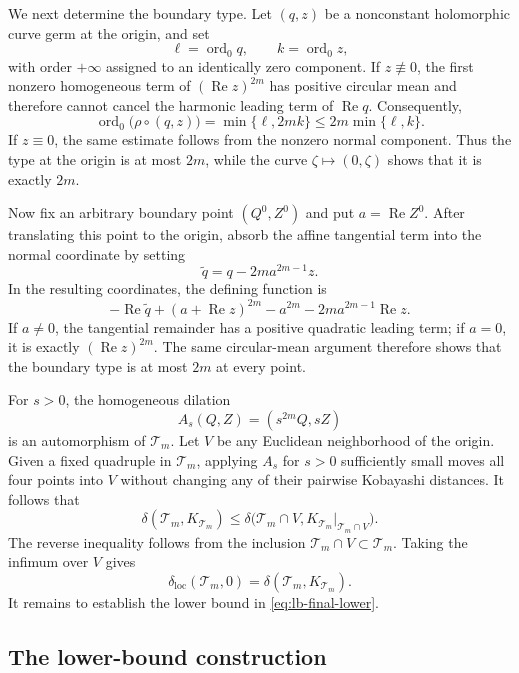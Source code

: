 \documentclass[11pt]{article}
\theoremstyle{definition}
\begin{document}
We next determine the boundary type. Let $(q,z)$ be a nonconstant
holomorphic curve germ at the origin, and set
\[
 \ell=\operatorname{ord}_0q,
 \qquad
 k=\operatorname{ord}_0z,
\]
with order $+\infty$ assigned to an identically zero component. If
$z\not\equiv0$, the first nonzero homogeneous term of
$(\operatorname{Re}z)^{2m}$ has positive circular mean and therefore cannot
cancel the harmonic leading term of $\operatorname{Re}q$. Consequently,
\[
 \operatorname{ord}_0\bigl(\rho\circ(q,z)\bigr)
 =\min\{\ell,2mk\}
 \leq2m\min\{\ell,k\}.
\]
If $z\equiv0$, the same estimate follows from the nonzero normal component.
Thus the type at the origin is at most $2m$, while the curve
$\zeta\mapsto(0,\zeta)$ shows that it is exactly $2m$.

Now fix an arbitrary boundary point $(Q^0,Z^0)$ and put
$a=\operatorname{Re}Z^0$. After translating this point to the origin, absorb
the affine tangential term into the normal coordinate by setting
\[
 \widetilde q=q-2ma^{2m-1}z.
\]
In the resulting coordinates, the defining function is
\[
 -\operatorname{Re}\widetilde q
 +(a+\operatorname{Re}z)^{2m}-a^{2m}
 -2ma^{2m-1}\operatorname{Re}z.
\]
If $a\neq0$, the tangential remainder has a positive quadratic leading term;
if $a=0$, it is exactly $(\operatorname{Re}z)^{2m}$. The same circular-mean
argument therefore shows that the boundary type is at most $2m$ at every
point.

For $s>0$, the homogeneous dilation
\begin{equation}\label{eq:lb-final-dilation}
 A_s(Q,Z)=(s^{2m}Q,sZ)
\end{equation}
is an automorphism of $\mathcal T_m$. Let $V$ be any Euclidean neighborhood
of the origin. Given a fixed quadruple in $\mathcal T_m$, applying $A_s$ for
$s>0$ sufficiently small moves all four points into $V$ without changing any
of their pairwise Kobayashi distances. It follows that
\[
 \delta(\mathcal T_m,K_{\mathcal T_m})
 \leq
 \delta\bigl(\mathcal T_m\cap V,
 K_{\mathcal T_m}|_{\mathcal T_m\cap V}\bigr).
\]
The reverse inequality follows from the inclusion
$\mathcal T_m\cap V\subset\mathcal T_m$.
Taking the infimum over $V$ gives
\[
 \delta_{\mathrm{loc}}(\mathcal T_m,0)
 =\delta(\mathcal T_m,K_{\mathcal T_m}).
\]
It remains to establish the lower bound in
\eqref{eq:lb-final-lower}.

\subsection{The lower-bound construction}
\label{subsec:lb-final-construction}\label{subsec:lb-final-slice}
\end{document}
